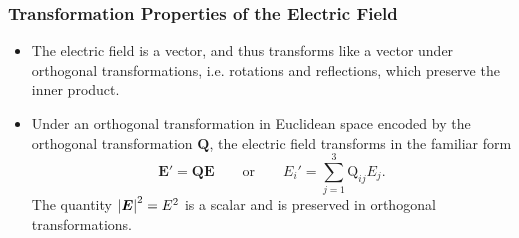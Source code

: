 \documentclass[11pt, a4paper]{article}
\renewcommand{\vec}[1]{\bm{#1}} %
\newcommand{\mat}[1]{\mathbf{#1}} %
\newcommand{\E}{\vec{E}} %
\begin{document}
\subsubsection{Transformation Properties of the Electric Field}
\begin{itemize}
    \item The electric field is a vector, and thus transforms like a vector under orthogonal transformations, i.e. rotations and reflections, which preserve the inner product. 

    \item Under an orthogonal transformation in Euclidean space encoded by the orthogonal transformation $ \mat{Q} $, the electric field transforms in the familiar form
    \begin{equation*}
        \E' = \mat{Q} \E \qquad \text{or} \qquad E_{i}' = \sum_{j = 1}^{3} \mathrm{Q}_{ij}E_{j}.
    \end{equation*}
    The quantity $ \abs{\E}^{2} = E^{2} $ is a scalar and is preserved in orthogonal transformations.
    
\end{itemize}
\end{document}
